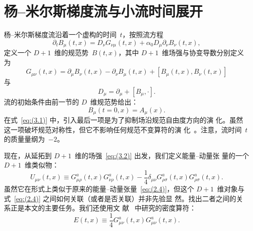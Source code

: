 \section{杨--米尔斯梯度流与小流时间展开}
\label{sec:3}
杨--米尔斯梯度流沿着一个虚构的时间~$t$，按照流方程
\begin{equation}
   \partial_tB_\mu(t,x)=D_\nu G_{\nu\mu}(t,x)
   +\alpha_0D_\mu\partial_\nu B_\nu(t,x),
\label{eq:(3.1)}
\end{equation}
定义一个 $D+1$~维的规范势~$B(t,x)$，其中 $D+1$~维场强与协变导数分别定义为
\begin{equation}
   G_{\mu\nu}(t,x)
   =\partial_\mu B_\nu(t,x)-\partial_\nu B_\mu(t,x)
   +[B_\mu(t,x),B_\nu(t,x)]
\label{eq:(3.2)}
\end{equation}
与
\begin{equation}
   D_\mu=\partial_\mu+[B_\mu,\cdot].
\label{eq:(3.3)}
\end{equation}
流的初始条件由前一节的 $D$~维规范势给出：
\begin{equation}
   B_\mu(t=0,x)=A_\mu(x).
\label{eq:(3.4)}
\end{equation}
在式~\eqref{eq:(3.1)} 中，引入最后一项是为了抑制场沿规范自由度方向的演
化。虽然这一项破坏规范对称性，但它不影响任何规范不变算符的演
化~\cite{Luscher:2010iy}。注意，流时间~$t$ 的质量量纲为~$-2$。

现在，从延拓到 $D+1$~维的场强~\eqref{eq:(3.2)} 出发，我们定义能量--动量张
量的一个 $D+1$~维类似物：
\begin{equation}
   U_{\mu\nu}(t,x)\equiv
   G_{\mu\rho}^a(t,x)G_{\nu\rho}^a(t,x)
   -\frac{1}{4}\delta_{\mu\nu}G_{\rho\sigma}^a(t,x)G_{\rho\sigma}^a(t,x).
\label{eq:(3.5)}
\end{equation}
虽然它在形式上类似于原来的能量--动量张量~\eqref{eq:(2.4)}，但这个
$D+1$~维对象与式~\eqref{eq:(2.4)} 之间如何关联（或者是否关联）并非先验显
然。找出二者之间的关系正是本文的主要任务。我们还使用文
献~\cite{Luscher:2010iy} 中研究的密度算符：
\begin{equation}
   E(t,x)\equiv\frac{1}{4}G_{\mu\nu}^a(t,x)G_{\mu\nu}^a(t,x).
\label{eq:(3.6)}
\end{equation}


